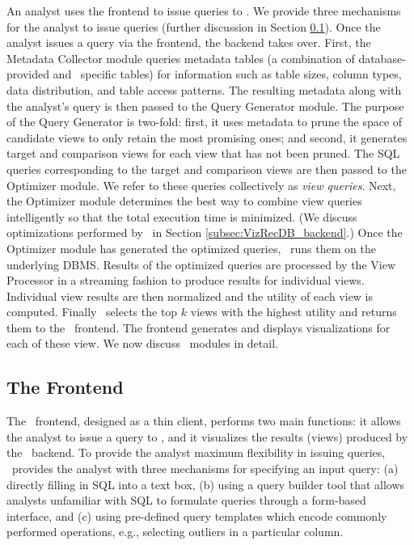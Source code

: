An analyst uses the frontend to issue queries to \VizRecDB. We provide three
mechanisms for the analyst to issue queries (further discussion in
Section \ref{subsec:VizRecDB_frontend}).
Once the analyst issues a query via the frontend, the backend takes over.
First, the Metadata Collector module queries metadata tables (a combination of
database-provided and \VizRecDB\ specific tables) for information such as table
sizes, column types, data distribution, and table access patterns.
The resulting metadata along with the analyst's query is then passed to the
Query Generator module. The purpose of the Query Generator is two-fold:
first, it uses metadata to prune the space of candidate views to only retain the
most promising ones; and second, it generates target and comparison views for
each view that has not been pruned.
The SQL queries corresponding to the target and comparison views are then passed
to the Optimizer module. We refer to these queries collectively as {\it view
queries}.
Next, the Optimizer module determines the best way to
combine view queries intelligently so that the total execution time is
minimized.
(We discuss optimizations performed by \VizRecDB\ in Section
\ref{subsec:VizRecDB_backend}.) Once the Optimizer module has generated the
optimized queries, \VizRecDB\ runs them on the underlying DBMS.
Results of the optimized queries are processed by the View Processor in a
streaming fashion to produce results for individual views. Individual view
results are then normalized and the utility of each view is computed.
Finally \VizRecDB\ selects the top $k$ views with the highest utility and returns
them to the \VizRecDB\ frontend. The frontend generates 
and displays visualizations for each of these view. We now discuss
\VizRecDB\ modules in detail.

\subsection{The Frontend}
\label{subsec:VizRecDB_frontend}

The \VizRecDB\ frontend, designed as a thin client, performs two main functions: it
allows the analyst to issue a query to \VizRecDB, 
and it visualizes the results (views) produced by the \VizRecDB\
backend.
To provide the analyst maximum flexibility in issuing queries, \VizRecDB\
provides the analyst with three
mechanisms for specifying an input query: 
(a) directly filling in SQL into a text box, 
(b) using a query builder tool that allows analysts
unfamiliar with SQL to formulate queries through a form-based interface, and (c)
using pre-defined query templates which encode commonly performed operations,
e.g., selecting outliers in a particular column. 

